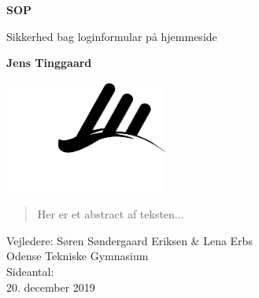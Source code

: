 \begin{titlepage}
   \begin{center}

       \Large
       \textbf{SOP}

        \vspace{0.5cm}
        \large
        Sikkerhed bag loginformular på hjemmeside

       \vspace{1cm}
       \large
       \textbf{Jens Tinggaard}

       \vspace{1cm}
       {\hspace{-2cm}\includegraphics[width=0.4\textwidth]{img/otg_logo.png}}

       \vspace{-0.5cm}
       \begin{abstract}
           Her er et abstract af teksten...
       \end{abstract}

       \vfill

       Vejledere: Søren Søndergaard Eriksen \& Lena Erbs\\
       Odense Tekniske Gymnasium\\
       Sideantal: \pageref{LastPage}\\
       20. december 2019
   \end{center}
\end{titlepage}
